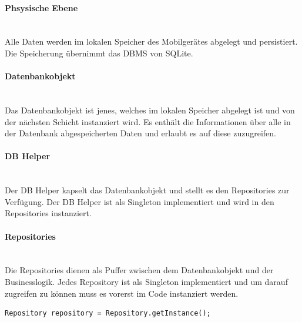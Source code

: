\documentclass[FIPLY_base.tex]{subfiles}
\begin{document}
\paragraph{Phsysische Ebene}\ \\
Alle Daten werden im lokalen Speicher des Mobilgerätes abgelegt und persistiert. Die Speicherung übernimmt das DBMS von SQLite.

\paragraph{Datenbankobjekt}\ \\
Das Datenbankobjekt ist jenes, welches im lokalen Speicher abgelegt ist und von der nächsten Schicht instanziert wird. Es enthält die Informationen über alle in der Datenbank abgespeicherten Daten und erlaubt es auf diese zuzugreifen.

\paragraph{DB Helper}\ \\
Der DB Helper kapselt das Datenbankobjekt und stellt es den Repositories zur Verfügung. Der DB Helper ist als Singleton implementiert und wird in den Repositories instanziert.


\newpage
\paragraph{Repositories}\ \\
Die Repositories dienen als Puffer zwischen dem Datenbankobjekt und der Businesslogik.
Jedes Repository ist als Singleton implementiert und um darauf zugreifen zu können muss es vorerst im Code instanziert werden.
\ \\
\begin{lstlisting}[caption={Repository wird instanziert.},label=DescriptiveLabel]
Repository repository = Repository.getInstance();
\end{lstlisting}
\end{document}
